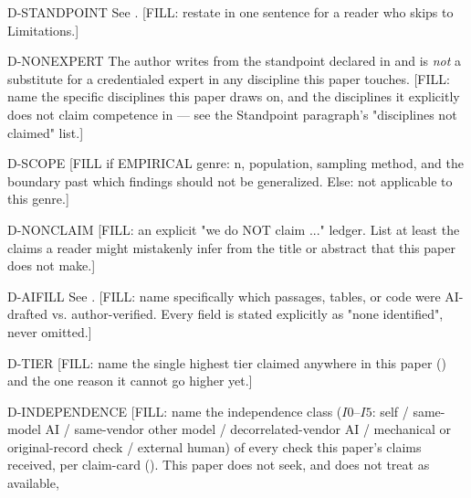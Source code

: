 
\begin{disclaimers}
  \item[D-STANDPOINT] See . [FILL: restate in one
    sentence for a reader who skips to Limitations.]
  \item[D-NONEXPERT] The author writes from the standpoint declared in
     and is \emph{not} a substitute for a credentialed
    expert in any discipline this paper touches. [FILL: name the specific
    disciplines this paper draws on, and the disciplines it explicitly does
    not claim competence in --- see the Standpoint paragraph's "disciplines
    not claimed" list.]
  \item[D-SCOPE] [FILL if EMPIRICAL genre: n, population, sampling method,
    and the boundary past which findings should not be generalized. Else:
    not applicable to this genre.]
  \item[D-NONCLAIM] [FILL: an explicit "we do NOT claim ..." ledger. List at
    least the claims a reader might mistakenly infer from the title or
    abstract that this paper does not make.]
  \item[D-AIFILL] See . [FILL: name specifically
    which passages, tables, or code were AI-drafted vs. author-verified.
    Every field is stated explicitly as "none identified", never omitted.]
  \item[D-TIER] [FILL: name the single highest tier claimed anywhere in this
    paper (\Cref{tab:tiers}) and the one reason it cannot go higher yet.]
  \item[D-INDEPENDENCE] [FILL: name the independence class (\(I0\)--\(I5\):
    self / same-model AI / same-vendor other model / decorrelated-vendor AI /
    mechanical or original-record check / external human) of every check
    this paper's claims received, per claim-card ().
    This paper does not seek, and does not treat as available,

\end{disclaimers}
